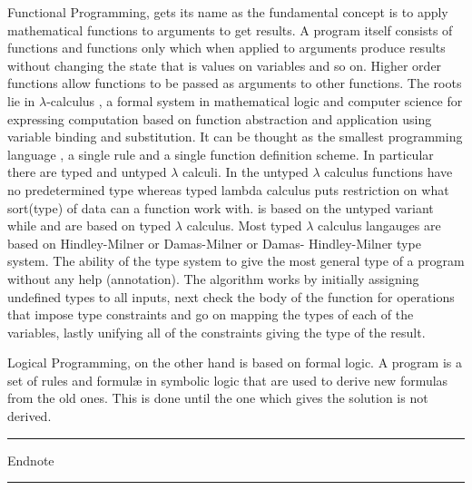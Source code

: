 \documentclass[thesis-solanki.tex]{subfiles}
\begin{document}
Functional Programming, \cite{hughes1989functional} gets its name as the fundamental concept is to apply
mathematical functions to arguments to get results.
A program itself consists of functions and functions only which when applied to arguments produce results without
changing the state that is values on variables and so on.
Higher order functions allow functions to be passed as arguments to other functions.
The roots lie in $\lambda$-calculus \cite{website:lambdacalculuswiki}, a formal system in mathematical logic and
computer science for expressing computation based on function abstraction and application using variable binding
and substitution.
It can be thought as the smallest programming language \cite{rojas2004tutorial}, a single rule and a single
function definition scheme.
In particular there are typed and untyped $\lambda$ calculi.
In the untyped $\lambda$ calculus functions have no predetermined type whereas\yyy{}{\large,} typed lambda calculus puts
restriction on what sort(type) of data can a function work with.
 is based on the untyped variant\yyy{}{\large,} while  and  are based on typed
$\lambda$ calculus.
Most typed $\lambda$ calculus langauges are based on Hindley-Milner or Damas-Milner or Damas- Hindley-Milner
\cite{website:hdmtypesystemwiki} type system.
The ability of the type system to give the most general type of a program without any help (annotation).
The algorithm \cite{website:hdmtypesystem} works by initially assigning undefined types to all inputs, next check
the body of the function for operations that impose type constraints and go on mapping the types of each of the
variables, lastly unifying all of the constraints giving the type of the result.

Logical Programming, \cite{spivey1995introduction} on the other hand is based on formal logic.
A program is a set of rules and formul\ae{} in symbolic logic that are used to derive new formulas from the old
ones.
This is done until the one which gives the solution is not derived.

\noindent
\textcolor{blue}{\rule{0.40\textwidth}{2pt}}
Endnote
\textcolor{blue}{\rule{0.40\textwidth}{2pt}}
\par
\end{document}
